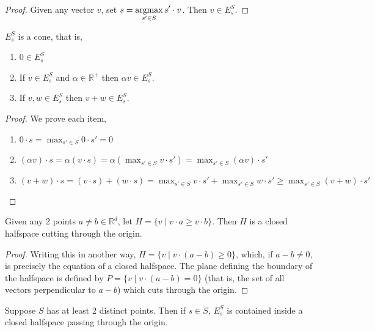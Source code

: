 \begin{proof}
Given any vector $v$, set $s = \displaystyle\operatorname*{argmax}_{s' \in S} s' \cdot v$. Then $v \in E^S_s$.
\end{proof}

\begin{lemma}  $E^S_s$ is a cone, that is,
\begin{enumerate}
\item $0 \in E^S_s$
\item If $v \in E^S_s$ and $\alpha \in \mathbb{R^+}$ then $\alpha v \in E^S_s$.
\item If $v, w \in E^S_s$ then $v + w \in E^S_s$.
\end{enumerate}
\end{lemma}

\begin{proof} We prove each item,
\begin{enumerate}
\item $0 \cdot s = \max_{s' \in S} 0 \cdot s' = 0$
\item $(\alpha v) \cdot s = \alpha (v \cdot s) = \alpha (\max_{s' \in S} v \cdot s') = \max_{s' \in S} (\alpha v) \cdot s'$
\item $(v + w) \cdot s = (v \cdot s) + (w \cdot s) = \max_{s' \in S} v \cdot s' + \max_{s' \in S} w \cdot s' \geq \max_{s' \in S} (v + w) \cdot s'$
\end{enumerate}
\end{proof}

\begin{lemma}  Given any 2 points $a \neq b \in \mathbb{R}^d$, let $H = \{v \; | \; v \cdot a \geq v \cdot b\}$. Then $H$ is a closed halfspace cutting through the origin.
\end{lemma}

\begin{proof}
Writing this in another way, $H = \{v \; | \; v \cdot (a - b) \geq 0\}$, which, if $a-b \neq 0$, is precisely the equation of a closed halfspace. The plane defining the boundary of the halfspace is defined by $P = \{v \; | \; v \cdot (a - b) = 0\}$ (that is, the set of all vectors perpendicular to $a-b$) which cuts through the origin.
\end{proof}

\begin{lemma}  Suppose $S$ has at least 2 distinct points. Then if $s \in S$, $E^S_s$ is contained inside a closed halfspace passing through the origin.
\end{lemma}

